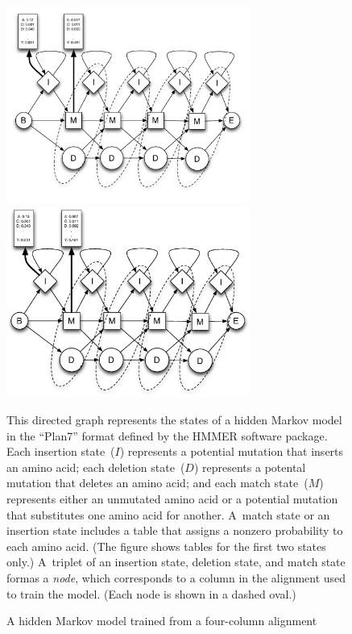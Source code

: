 \documentclass[preprint,nonatbib,blockstyle,nocopyrightspace,times]{sigplanconf}
\begin{document}
\begin{figure} 
\ifpdfmadness
\centerline{\includegraphics[width=8cm]{Plan7.pdf}} 
\else
\centerline{\includegraphics[width=8cm]{Plan7.eps}} 
\fi

This directed graph represents the states of a
hidden Markov model in the ``Plan7'' format defined by the HMMER
software package.
Each insertion state~($I$) represents a potential mutation that 
inserts an amino acid;
each deletion state~($D$) represents a potental mutation that
deletes an amino acid;
and each match state~($M$) represents either
an unmutated amino acid or a potential mutation that
substitutes one amino acid for another.
A~match state or an insertion state includes a table that assigns a
nonzero probability to each amino acid.
(The figure shows tables for the first two states only.)
A~triplet of an insertion state, deletion state, 
and match state formas a \emph{node}, which corresponds to a column in
the alignment used to train the model.
(Each node is shown in a dashed oval.)

\caption{A hidden Markov model trained from a four-column alignment}

\label{plan7} \end{figure}
\end{document}
